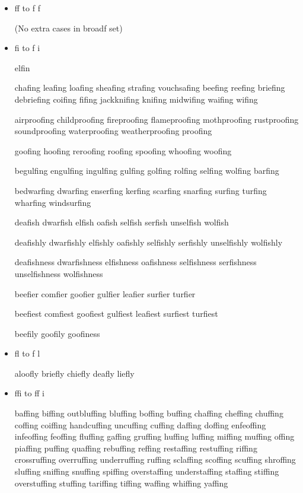 \begin{itemize}

\item ff to f\kern0pt f

(No extra cases in broadf set)


\item fi to f\kern0pt i

elfin

chafing leafing loafing sheafing strafing vouchsafing
beefing reefing briefing debriefing
coifing fifing jackknifing knifing midwifing waifing wifing

airproofing childproofing fireproofing flameproofing mothproofing rustproofing soundproofing waterproofing weatherproofing proofing

goofing hoofing reroofing roofing spoofing whoofing woofing

begulfing engulfing ingulfing gulfing golfing rolfing selfing wolfing
barfing

bedwarfing dwarfing enserfing kerfing scarfing snarfing
surfing turfing wharfing windsurfing

deafish dwarfish elfish oafish selfish serfish unselfish wolfish

deafishly dwarfishly elfishly oafishly selfishly serfishly unselfishly wolfishly

deafishness dwarfishness elfishness oafishness selfishness serfishness unselfishness wolfishness

beefier comfier goofier gulfier leafier surfier turfier

beefiest comfiest goofiest gulfiest leafiest surfiest turfiest

beefily goofily goofiness


\item fl to f\kern0pt l

aloofly briefly chiefly deafly liefly


\item ffi to ff\kern0pt i

baffing biffing outbluffing bluffing boffing buffing chaffing cheffing chuffing coffing coiffing handcuffing uncuffing cuffing daffing doffing enfeoffing infeoffing feoffing fluffing gaffing gruffing huffing luffing miffing muffing offing piaffing puffing quaffing rebuffing reffing restaffing restuffing riffing crossruffing overruffing underruffing ruffing sclaffing scoffing scuffing shroffing sluffing sniffing snuffing spiffing overstaffing understaffing staffing stiffing overstuffing stuffing tariffing tiffing waffing whiffing yaffing


\end{itemize}
